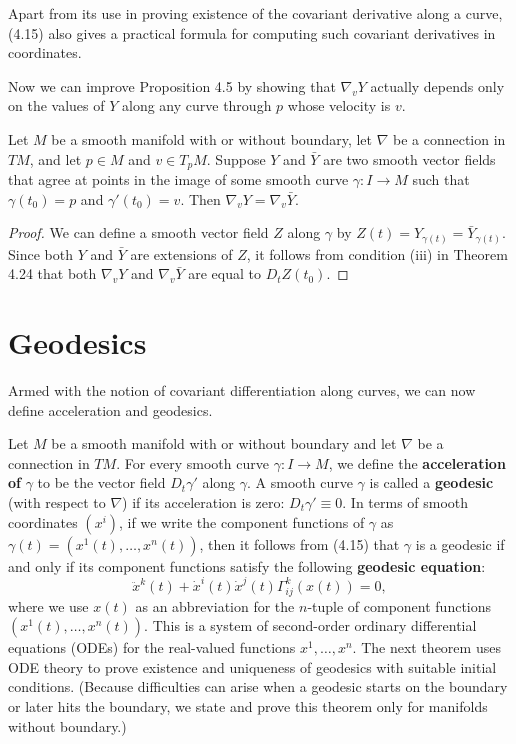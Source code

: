 Apart from its use in proving existence of the covariant derivative along a curve, (4.15) also gives a practical formula for computing such covariant derivatives in coordinates.

Now we can improve Proposition 4.5 by showing that $\nabla_v Y$ actually depends only on the values of $Y$ along any curve through $p$ whose velocity is $v$.

\begin{proposition}
\label{prop:covariant-derivative-depends-on-curve}
Let $M$ be a smooth manifold with or without boundary, let $\nabla$ be a connection in $TM$, and let $p \in M$ and $v \in T_p M$. Suppose $Y$ and $\bar{Y}$ are two smooth vector fields that agree at points in the image of some smooth curve $\gamma: I \to M$ such that $\gamma(t_0) = p$ and $\gamma'(t_0) = v$. Then $\nabla_v Y = \nabla_v \bar{Y}$.
\end{proposition}

\begin{proof}
We can define a smooth vector field $Z$ along $\gamma$ by $Z(t) = Y_{\gamma(t)} = \bar{Y}_{\gamma(t)}$. Since both $Y$ and $\bar{Y}$ are extensions of $Z$, it follows from condition (iii) in Theorem 4.24 that both $\nabla_v Y$ and $\nabla_v \bar{Y}$ are equal to $D_t Z(t_0)$.
\end{proof}

\section{Geodesics}

Armed with the notion of covariant differentiation along curves, we can now define acceleration and geodesics.

Let $M$ be a smooth manifold with or without boundary and let $\nabla$ be a connection in $TM$. For every smooth curve $\gamma: I \to M$, we define the \textbf{acceleration of} $\gamma$ to be the vector field $D_t \gamma'$ along $\gamma$. A smooth curve $\gamma$ is called a \textbf{geodesic} (with respect to $\nabla$) if its acceleration is zero: $D_t \gamma' \equiv 0$. In terms of smooth coordinates $(x^i)$, if we write the component functions of $\gamma$ as $\gamma(t) = (x^1(t), \ldots, x^n(t))$, then it follows from (4.15) that $\gamma$ is a geodesic if and only if its component functions satisfy the following \textbf{geodesic equation}:
\begin{equation}
\ddot{x}^k(t) + \dot{x}^i(t) \dot{x}^j(t) \Gamma^k_{ij}(x(t)) = 0, \tag{4.16}
\end{equation}
where we use $x(t)$ as an abbreviation for the $n$-tuple of component functions $(x^1(t), \ldots, x^n(t))$. This is a system of second-order ordinary differential equations (ODEs) for the real-valued functions $x^1, \ldots, x^n$. The next theorem uses ODE theory to prove existence and uniqueness of geodesics with suitable initial conditions. (Because difficulties can arise when a geodesic starts on the boundary or later hits the boundary, we state and prove this theorem only for manifolds without boundary.)

